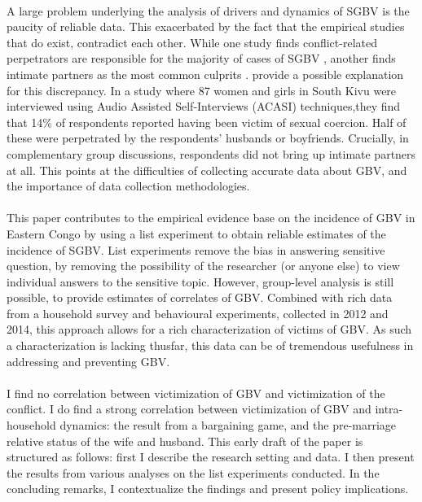 \documentclass[11pt,a4paper]{scrartcl} %
\begin{document}
\paragraph{}
A large problem underlying the analysis of drivers and dynamics of SGBV is the paucity of reliable data. This exacerbated by the fact that the empirical studies that do exist, contradict each other. While one study finds conflict-related perpetrators are responsible for the majority of cases of SGBV \citep{Johnson2010}, another finds intimate partners as the most common culprits \citep{Peterman2011}. \citet{Stark2017} provide a possible explanation for this discrepancy. In a study where 87 women and girls in South Kivu were interviewed using Audio Assisted Self-Interviews (ACASI) techniques,they find that 14\% of respondents reported having been victim of sexual coercion. Half of these were perpetrated by the respondents' husbands or boyfriends. Crucially, in complementary group discussions, respondents did not bring up intimate partners at all. This points at the difficulties of collecting accurate data about GBV, and the importance of data collection methodologies. 

\paragraph{}
This paper contributes to the empirical evidence base on the incidence of GBV in Eastern Congo by using a list experiment to obtain reliable estimates of the incidence of SGBV. List experiments remove the bias in answering sensitive question, by removing the possibility of the researcher (or anyone else) to view individual answers to the sensitive topic. However, group-level analysis is still possible, to provide estimates of correlates of GBV. Combined with rich data from a household survey and behavioural experiments, collected in 2012 and 2014, this approach allows for a rich characterization of victims of GBV. As such a characterization is lacking thusfar, this data can be of tremendous usefulness in addressing and preventing GBV.

\paragraph{}
I find no correlation between victimization of GBV and victimization of the conflict. I do find a strong correlation between victimization of GBV and intra-household dynamics: the result from a bargaining game, and the pre-marriage relative status of the wife and husband. This early draft of the paper is structured as follows: first I describe the research setting and data. I then present the results from various analyses on the list experiments conducted. In the concluding remarks, I contextualize the findings and present policy implications.
\end{document}
